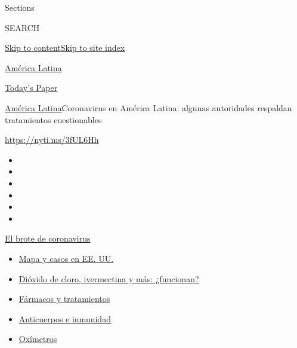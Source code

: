Sections

SEARCH

\protect\hyperlink{site-content}{Skip to
content}\protect\hyperlink{site-index}{Skip to site index}

\href{https://www.nytimes3xbfgragh.onion/es/section/america-latina}{América
Latina}

\href{https://myaccount.nytimes3xbfgragh.onion/auth/login?response_type=cookie\&client_id=vi}{}

\href{https://www.nytimes3xbfgragh.onion/section/todayspaper}{Today's
Paper}

\href{/es/section/america-latina}{América Latina}\textbar{}Coronavirus
en América Latina: algunas autoridades respaldan tratamientos
cuestionables

\url{https://nyti.ms/3fUL6Hh}

\begin{itemize}
\item
\item
\item
\item
\item
\item
\end{itemize}

\href{https://www.nytimes3xbfgragh.onion/es/spotlight/coronavirus?action=click\&pgtype=Article\&state=default\&region=TOP_BANNER\&context=storylines_menu}{El
brote de coronavirus}

\begin{itemize}
\tightlist
\item
  \href{https://www.nytimes3xbfgragh.onion/es/interactive/2020/espanol/mundo/coronavirus-en-estados-unidos.html?action=click\&pgtype=Article\&state=default\&region=TOP_BANNER\&context=storylines_menu}{Mapa
  y casos en EE. UU.}
\item
  \href{https://www.nytimes3xbfgragh.onion/es/2020/07/23/espanol/america-latina/bolivia-cloro-coronavirus-ivermectina.html?action=click\&pgtype=Article\&state=default\&region=TOP_BANNER\&context=storylines_menu}{Dióxido
  de cloro, ivermectina y más: ¿funcionan?}
\item
  \href{https://www.nytimes3xbfgragh.onion/es/interactive/2020/science/coronavirus-tratamientos-curas.html?action=click\&pgtype=Article\&state=default\&region=TOP_BANNER\&context=storylines_menu}{Fármacos
  y tratamientos}
\item
  \href{https://www.nytimes3xbfgragh.onion/es/2020/07/28/espanol/ciencia-y-tecnologia/anticuerpos-coronavirus-inmunidad.html?action=click\&pgtype=Article\&state=default\&region=TOP_BANNER\&context=storylines_menu}{Anticuerpos
  e inmunidad}
\item
  \href{https://www.nytimes3xbfgragh.onion/es/2020/04/29/espanol/estilos-de-vida/oximetro-para-que-sirve.html?action=click\&pgtype=Article\&state=default\&region=TOP_BANNER\&context=storylines_menu}{Oxímetros}
\end{itemize}

